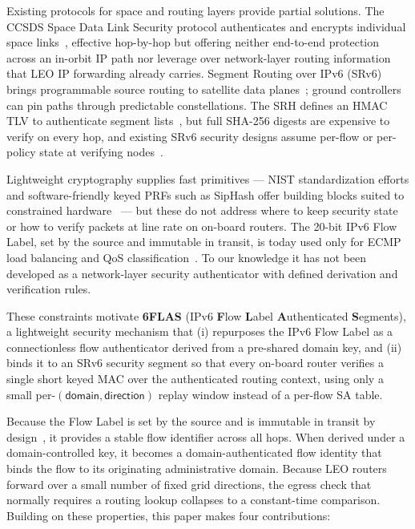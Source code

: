 Existing protocols for space and routing layers provide partial solutions.
The CCSDS Space Data Link Security protocol authenticates and
encrypts individual space links~\cite{ccsds}, effective hop-by-hop but
offering neither end-to-end protection across an in-orbit IP path nor leverage over
network-layer routing information that LEO IP forwarding already carries.
Segment Routing over IPv6 (SRv6) brings programmable source routing to
satellite data planes~\cite{rfc8402,rfc8754,rfc8986,rfc9252}; ground controllers can
pin paths through predictable constellations. The SRH defines an HMAC TLV to
authenticate segment lists~\cite{rfc8754,srsurvey}, but full SHA-256 digests are expensive to verify on every hop, and
existing SRv6 security designs assume per-flow or per-policy state at
verifying nodes~\cite{wang2024byzantine}.

Lightweight cryptography supplies fast primitives --- NIST
standardization efforts and software-friendly keyed PRFs such
as SipHash offer building blocks suited to constrained
hardware~\cite{nistlwc,simon,siphash} --- but these do not address
where to keep security state or how to verify packets at line rate on
on-board routers. The 20-bit IPv6 Flow Label, set by the source and immutable in transit,
is today used only for ECMP load balancing and QoS
classification~\cite{rfc6437,rfc6438}. To our knowledge it has not been
developed as a network-layer security authenticator with defined derivation
and verification rules.


These constraints motivate \textbf{6FLAS} (IPv6 \textbf{F}low \textbf{L}abel
\textbf{A}uthenticated \textbf{S}egments), a lightweight security mechanism
that (i) repurposes the IPv6 Flow Label as a connectionless flow authenticator
derived from a pre-shared domain key, and (ii) binds it to an SRv6 security
segment so that every on-board router verifies a single short keyed MAC over
the authenticated routing context, using only a small per-$(\textsf{domain}, \textsf{direction})$ replay window instead of a
per-flow SA table.

Because the Flow Label is set by the source and is immutable
in transit by design~\cite{rfc6437}, it provides a stable flow identifier across all hops. When derived under a domain-controlled key, it becomes a domain-authenticated flow identity that binds the flow to its originating administrative domain. Because LEO routers forward over a small
number of fixed grid directions, the egress check that normally requires a
routing lookup collapses to a constant-time comparison. Building on these properties,
this paper makes four contributions:

